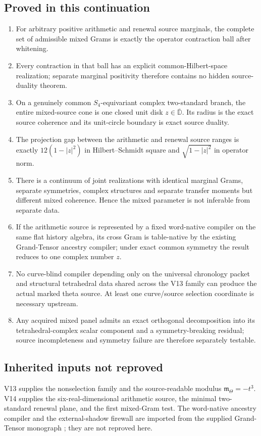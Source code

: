 \documentclass[11pt]{article}
\theoremstyle{definition}
\theoremstyle{remark}
\begin{document}
\subsection{Proved in this continuation}
\begin{enumerate}[leftmargin=2.2em]
\item For arbitrary positive arithmetic and renewal source marginals, the
      complete set of admissible mixed Grams is exactly the operator
      contraction ball after whitening.
\item Every contraction in that ball has an explicit common-Hilbert-space
      realization; separate marginal positivity therefore contains no hidden
      source-duality theorem.
\item On a genuinely common $S_4$-equivariant complex two-standard branch,
      the entire mixed-source cone is one closed unit disk $z\in\overline{\mathbb D}$.
      Its radius is the exact source coherence and its unit-circle boundary is
      exact source duality.
\item The projection gap between the arithmetic and renewal source ranges is
      exactly $12(1-|z|^2)$ in Hilbert--Schmidt square and
      $\sqrt{1-|z|^2}$ in operator norm.
\item There is a continuum of joint realizations with identical marginal
      Grams, separate symmetries, complex structures and separate transfer
      moments but different mixed coherence.  Hence the mixed parameter is
      not inferable from separate data.
\item If the arithmetic source is represented by a fixed word-native compiler
      on the same flat history algebra, its cross Gram is table-native by the
      existing Grand-Tensor ancestry compiler; under exact common symmetry the
      result reduces to one complex number $z$.
\item No curve-blind compiler depending only on the universal chronology
      packet and structural tetrahedral data shared across the V13 family can
      produce the actual marked theta source.  At least one curve/source
      selection coordinate is necessary upstream.
\item Any acquired mixed panel admits an exact orthogonal decomposition into
      its tetrahedral-complex scalar component and a symmetry-breaking
      residual; source incompleteness and symmetry failure are therefore
      separately testable.
\end{enumerate}

\subsection{Inherited inputs not reproved}
V13 supplies the nonselection family and the source-readable modulus
$\mathfrak m_\Theta=-t^3$.  V14 supplies the six-real-dimensional arithmetic
source, the minimal two-standard renewal plane, and the first mixed-Gram test.
The word-native ancestry compiler and the external-shadow firewall are
imported from the supplied Grand-Tensor monograph \cite{GT77}; they are not
reproved here.
\end{document}
